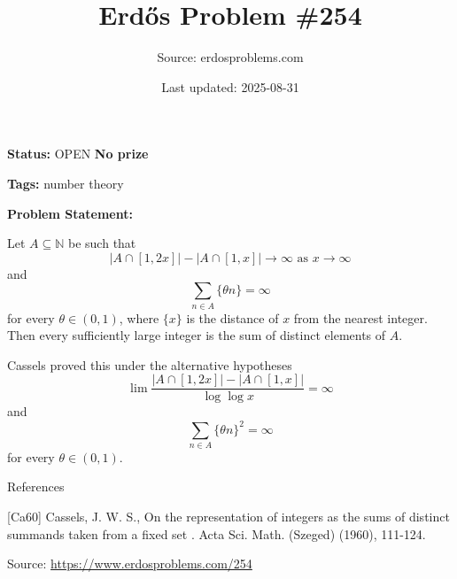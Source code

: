 \documentclass{article}
\title{Erd\H{o}s Problem \#254}
\date{Last updated: 2025-08-31}
\author{Source: erdosproblems.com}
\begin{document}
\maketitle

\noindent\textbf{Status:} OPEN \quad \textbf{No prize}

\noindent\textbf{Tags:} number theory

\medskip

\noindent\textbf{Problem Statement:}

Let $A\subseteq \mathbb{N}$ be such that\[\lvert A\cap [1,2x]\rvert -\lvert A\cap [1,x]\rvert \to \infty\textrm{ as }x\to \infty\]and\[\sum_{n\in A} \{ \theta n\}=\infty\]for every $\theta\in (0,1)$, where $\{x\}$ is the distance of $x$ from the nearest integer. Then every sufficiently large integer is the sum of distinct elements of $A$.




Cassels \cite{Ca60} proved this under the alternative hypotheses\[\lim \frac{\lvert A\cap [1,2x]\rvert -\lvert A\cap [1,x]\rvert}{\log\log x}=\infty\]and\[\sum_{n\in A} \{ \theta n\}^2=\infty\]for every $\theta\in (0,1)$.




References

[Ca60] Cassels, J. W. S., On the representation of integers as the sums of distinct summands taken from a fixed set . Acta Sci. Math. (Szeged) (1960), 111-124.


\bigskip
\noindent\small{Source: \url{https://www.erdosproblems.com/254}}
\end{document}
